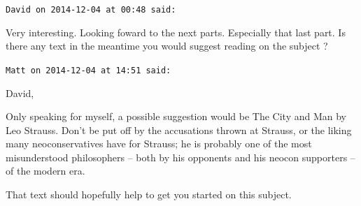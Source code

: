 \begin{footnotesize}\begin{sffamily}



\texttt{David on 2014-12-04 at 00:48 said: }

Very interesting. Looking foward to the next parts. Especially that last part. Is there any text in the meantime you would suggest reading on the subject ?


\hfill

\texttt{Matt on 2014-12-04 at 14:51 said: }

David,

Only speaking for myself, a possible suggestion would be The City and Man by Leo Strauss. Don't be put off by the accusations thrown at Strauss, or the liking many neoconservatives have for Strauss; he is probably one of the most misunderstood philosophers – both by his opponents and his neocon supporters – of the modern era.

That text should hopefully help to get you started on this subject.


\hfill


\end{sffamily}\end{footnotesize}
